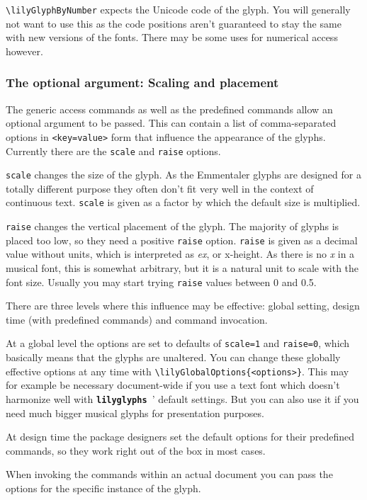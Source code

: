\documentclass{article}
\newcommand{\lilyglyphs}{\texttt{\textbf{lilyglyphs\,}}}
\newcommand*{\cmd}[1]{\texttt{\textbackslash #1}}
\begin{document}
\cmd{lilyGlyphByNumber} expects the Unicode code of the glyph. 
You will generally not want to use this as the code positions aren't guaranteed to stay the same with new versions of the fonts. 
There may be some uses for numerical access however.

\subsubsection{The optional argument: Scaling and placement}
The generic access commands as well as the predefined commands allow an optional argument to be passed.
This can contain a list of comma-separated options in \texttt{<key=value>} form that influence the appearance of the glyphs. Currently there are the \texttt{scale} and \texttt{raise} options.

\texttt{scale} changes the size of the glyph. 
As the Emmentaler glyphs are designed for a totally different purpose they often don't fit very well in the context of continuous text.
\texttt{scale} is given as a factor by which the default size is multiplied.

\texttt{raise} changes the vertical placement of the glyph.
The majority of glyphs is placed too low, so they need a positive \texttt{raise} option.
\texttt{raise} is given as a decimal value without units, which is interpreted as \emph{ex}, or x-height. 
As there is no \emph{x} in a musical font, this is somewhat arbitrary, but it is a natural unit to scale with the font size.
Usually you may start trying \texttt{raise} values between 0 and 0.5.

There are three levels where this influence may be effective: global setting, design time (with predefined commands) and command invocation.

At a global level the options are set to defaults of \texttt{scale=1} and \texttt{raise=0}, which basically means that the glyphs are unaltered.
You can change these globally effective options at any time with \cmd{lilyGlobalOptions\{<options>\}}.
This may for example be necessary document-wide if you use a text font which doesn't harmonize well with \lilyglyphs' default settings.
But you can also use it if you need much bigger musical glyphs for presentation purposes.

At design time the package designers set the default options for their predefined commands, so they work right out of the box in most cases.

When invoking the commands within an actual document you can pass the options for the specific instance of the glyph.
\end{document}
